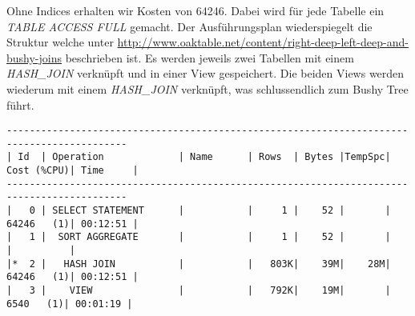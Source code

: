 \documentclass[11pt,a4paper,parskip=half]{scrartcl}
\begin{document}
Ohne Indices erhalten wir Kosten von 64246. Dabei wird für jede Tabelle ein \emph{TABLE ACCESS FULL} gemacht. Der Ausführungsplan wiederspiegelt die Struktur welche unter \url{http://www.oaktable.net/content/right-deep-left-deep-and-bushy-joins} beschrieben ist. Es werden jeweils zwei Tabellen mit einem \emph{HASH\_JOIN} verknüpft und in einer View gespeichert. Die beiden Views werden wiederum mit einem \emph{HASH\_JOIN} verknüpft, was schlussendlich zum Bushy Tree führt.
\begin{lstlisting}
-------------------------------------------------------------------------------------------                                                                                                                                                                                                                  
| Id  | Operation             | Name      | Rows  | Bytes |TempSpc| Cost (%CPU)| Time     |                                                                                                                                                                                                                  
-------------------------------------------------------------------------------------------                                                                                                                                                                                                                  
|   0 | SELECT STATEMENT      |           |     1 |    52 |       | 64246   (1)| 00:12:51 |                                                                                                                                                                                                                  
|   1 |  SORT AGGREGATE       |           |     1 |    52 |       |            |          |                                                                                                                                                                                                                  
|*  2 |   HASH JOIN           |           |   803K|    39M|    28M| 64246   (1)| 00:12:51 |                                                                                                                                                                                                                  
|   3 |    VIEW               |           |   792K|    19M|       |  6540   (1)| 00:01:19 |                                                                                                                                                                                                                  

\end{lstlisting}
\end{document}
